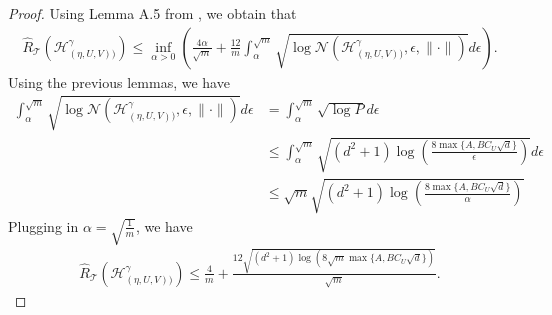 \begin{proof}
    Using Lemma A.5 from \cite{bartlett2017spectrally}, we obtain that 
    \begin{align*}
        \hat R_{\mathcal{T}}\left(\mathcal{H}^\gamma_{(\eta, U, V))}\right)
        \leq \inf_{\alpha > 0}\left(\frac{4\alpha}{\sqrt{m}} + \frac{12}{m} \int_{\alpha}^{\sqrt{m}} \sqrt{\log \mathcal{N}(\mathcal{H}^\gamma_{(\eta, U, V))}, \epsilon, \|\cdot \|)} d\epsilon\right).
    \end{align*}
    Using the previous lemmas, we have
    \begin{align*}
        \int_{\alpha}^{\sqrt{m}} \sqrt{\log \mathcal{N}(\mathcal{H}^\gamma_{(\eta, U, V))}, \epsilon, \|\cdot \|)} d\epsilon
        &= \int_{\alpha}^{\sqrt{m}} \sqrt{\log P} d\epsilon \\
        &\leq \int_{\alpha}^{\sqrt{m}} \sqrt{(d^2+1)\log \left(\frac{8\max\{A, BC_U\sqrt{d}\}}{\epsilon}\right)} d\epsilon\\
        &\leq \sqrt{m}\sqrt{(d^2+1)\log \left(\frac{8\max\{A, BC_U\sqrt{d}\}}{\alpha}\right)}
    \end{align*}
    Plugging in $\alpha = \sqrt{\frac{1}{m}}$, we have
    \begin{align*}
        \hat R_{\mathcal{T}}\left(\mathcal{H}^\gamma_{(\eta, U, V))}\right)
        \leq \frac{4}{m} + \frac{12\sqrt{(d^2+1)\log \left(8\sqrt{m}\max\{A, BC_U\sqrt{d}\}\right)}}{\sqrt{m}}.
    \end{align*}
\end{proof}
